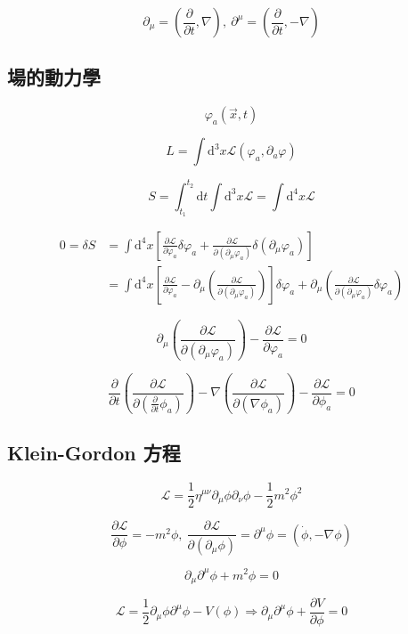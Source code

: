 \documentclass{article}
\begin{document}
$$\partial_{\mu}=(\frac{\partial}{\partial t},\nabla),\ \partial^{\mu}=(\frac{\partial}{\partial t},-\nabla)$$

\subsection{場的動力學}

$$\varphi_a(\vec{x},t)$$

$$L=\int\mathrm{d}^3x\mathcal{L}(\varphi_a,\partial_a\varphi)$$

$$S=\int_{t_{1}}^{t_{2}}\mathrm{d}t\int \mathrm{d}^{3} x \mathcal{L}=\int \mathrm{d}^{4} x \mathcal{L}$$

$$\begin{aligned}
    0=\delta S & =\int\mathrm{d}^4x[\frac{\partial\mathcal{L}}{\partial\varphi_a}\delta\varphi_a+\frac{\partial\mathcal{L}}{\partial(\partial_\mu\varphi_a)}\delta(\partial_\mu\varphi_a)]                                                                           \\
               & =\int\mathrm{d}^4x[\frac{\partial\mathcal{L}}{\partial\varphi_a}-\partial_\mu(\frac{\partial\mathcal{L}}{\partial(\partial_\mu\varphi_a)})]\delta\varphi_a+\partial_\mu(\frac{\partial\mathcal{L}}{\partial(\partial_\mu\varphi_a)}\delta\varphi_a)
  \end{aligned}$$

$$\partial_\mu(\frac{\partial\mathcal{L}}{\partial(\partial_\mu\varphi_a)})-\frac{\partial\mathcal{L}}{\partial\varphi_a}=0$$

$$\frac{\partial}{\partial t}(\frac{\partial\mathcal{L}}{\partial(\frac{\partial}{\partial t}\phi_{a})})-\nabla(\frac{\partial\mathcal{L}}{\partial(\nabla\phi_{a})})-\frac{\partial\mathcal{L}}{\partial\phi_{a}}=0$$

\subsection{Klein-Gordon 方程}

$$\mathcal{L}=\frac{1}{2}\eta^{\mu\nu}\partial_{\mu}\phi\partial_{\nu}\phi-\frac{1}{2}m^2\phi^2$$

$$\frac{\partial\mathcal{L}}{\partial\phi}=-m^2\phi,\ \frac{\partial\mathcal{L}}{\partial(\partial_{\mu}\phi)}=\partial^{\mu}\phi=(\dot{\phi},-\nabla\phi)$$

$$\partial_{\mu}\partial^{\mu}\phi+m^2\phi=0$$

$$\mathcal{L}=\frac{1}{2}\partial_{\mu}\phi\partial^{\mu}\phi-V(\phi)\Rightarrow\partial_{\mu}\partial^{\mu}\phi+\frac{\partial V}{\partial\phi}=0$$
\end{document}
